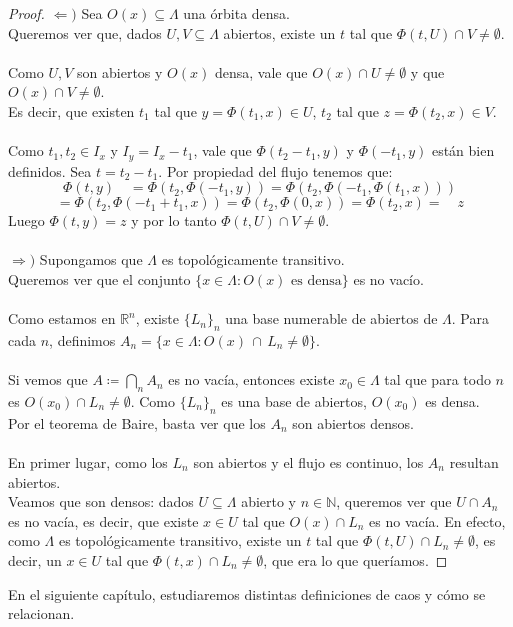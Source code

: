 \documentclass[12pt,a4paper]{article}
\begin{document}
\begin{proof}
    $\Leftarrow)$ Sea $O(x) \subseteq \Lambda$ una órbita densa.
    \\
    Queremos ver que, dados $U, V \subseteq \Lambda$ abiertos, existe un $t$ tal que $\Phi(t,U) \cap V \neq \emptyset$.
    \\
    \\
    Como $U, V$ son abiertos y $O(x)$ densa, vale que $O(x) \cap U \neq \emptyset$ y que $O(x) \cap V \neq \emptyset$.
    \\
    Es decir, que existen $t_1$ tal que $y = \Phi(t_1,x) \in U$, $t_2$ tal que $z =\Phi(t_2,x) \in V$.
    \\
    \\
    Como $t_1, t_2 \in I_x$ y $I_y = I_x - t_1$, vale que $\Phi(t_2-t_1, y)$ y $\Phi(-t_1, y)$ están bien definidos. Sea $t = t_2 - t_1$. Por propiedad del flujo tenemos que:
    \[
    \Phi(t,y) \quad = \Phi(t_2,\Phi(-t_1,y)) = \Phi(t_2,\Phi(-t_1,\Phi(t_1,x))) 
    \]
    \[
    = \Phi(t_2,\Phi(-t_1+t_1, x)) = \Phi(t_2,\Phi(0, x))
    = \Phi(t_2,x) = \quad z
    \]
    Luego $\Phi(t, y) = z$ y por lo tanto $\Phi(t,U) \cap V \neq \emptyset$.
    \\
    \\
    $\Rightarrow)$ Supongamos que $\Lambda$ es topológicamente transitivo. 
    \\
    Queremos ver que el conjunto $\{x \in \Lambda: O(x) \text{ es densa}\}$ es no vacío.
    \\
    \\
    Como estamos en $\mathbb{R}^n$, existe $\{L_n\}_n$ una base numerable de abiertos de $\Lambda$. Para cada $n$, definimos $A_n = \{x \in \Lambda : O(x) \, \cap \, L_n \neq \emptyset\}$.
    \\
    \\
    Si vemos que $A \coloneqq \displaystyle \bigcap_n A_n$ es no vacía, entonces existe $x_0 \in \Lambda$ tal que para todo $n$ es $O(x_0) \cap L_n \neq \emptyset$. Como $\{L_n\}_n$ es una base de abiertos, $O(x_0)$ es densa.
    \\
    Por el teorema de Baire, basta ver que los $A_n$ son abiertos densos.
    \\
    \\
    En primer lugar, como los $L_n$ son abiertos y el flujo es continuo, los $A_n$ resultan abiertos. 
    \\
    Veamos que son densos: dados $U \subseteq \Lambda$ abierto y $n \in \mathbb{N}$, queremos ver que $U \cap A_n$ es no vacía, es decir, que existe $x \in U$ tal que $O(x) \cap L_n$ es no vacía. En efecto, como $\Lambda$ es topológicamente transitivo, existe un $t$ tal que $\Phi(t,U) \cap L_n \neq \emptyset$, es decir, un $x \in U$ tal que $\Phi(t, x) \cap L_n \neq \emptyset$, que era lo que queríamos.
\end{proof}
En el siguiente capítulo, estudiaremos distintas definiciones de caos y cómo se relacionan.
\end{document}
